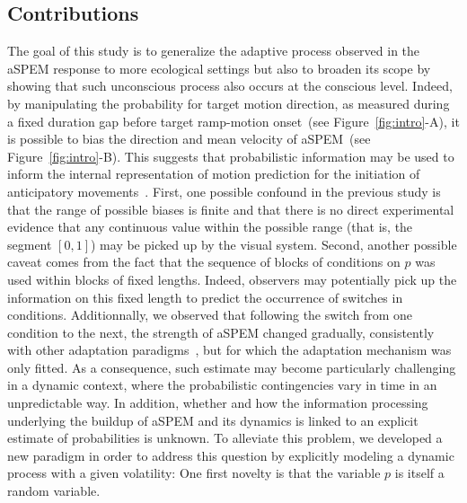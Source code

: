 \documentclass[profile,final,english,draft]{article}%
\newcommand{\citep}[1]{\parencite{#1}}
\newcommand{\seeFig}[1]{Figure~\ref{fig:#1}}
\begin{document}
\subsection{Contributions}%
The goal of this study is to generalize the adaptive process
observed in the aSPEM response to more ecological settings but
also to broaden its scope by showing that such unconscious process
also occurs at the conscious level.
Indeed, by manipulating the probability for target motion direction,
as measured during a fixed duration gap
before target ramp-motion onset~(see \seeFig{intro}-A),
it is possible to bias the direction and mean velocity of aSPEM~(see \seeFig{intro}-B).
This suggests that probabilistic information may be used
to inform the internal representation of motion prediction
for the initiation of anticipatory movements~\citep{Montagnini2010}.
First, one possible confound in the previous study
is that the range of possible biases is finite and
that there is no direct experimental evidence that
any continuous value within the possible range (that is, the segment $[ 0, 1 ]$)
may be picked up by the visual system.
Second, another possible caveat comes from the fact that the sequence of blocks of conditions on $p$
was used within blocks of fixed lengths.
Indeed, observers may potentially pick up
the information on this fixed length
to predict the occurrence of switches in conditions.
Additionnally, we observed that following the switch from
one condition to the next,
the strength of aSPEM changed gradually,
consistently with other adaptation paradigms~\citep{SoutoXXSacadicAdaptation},
but for which the adaptation mechanism was only fitted.
As a consequence, such estimate may become particularly
challenging in a dynamic context,
where the probabilistic contingencies vary in time in an unpredictable way.
In addition, whether and how the information processing underlying
the buildup of aSPEM and its dynamics is linked to
an explicit estimate of probabilities is unknown.
To alleviate this problem, we developed a new paradigm
in order to address this question
by explicitly modeling a dynamic process with a given volatility:
One first novelty is that the variable $p$ is itself a random variable.
\end{document}
